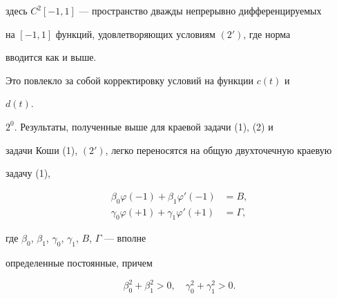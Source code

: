 здесь $C^2[-1,1]$ --- пространство дважды непрерывно дифференцируемых 


на $[-1,1]$ функций, удовлетворяющих условиям $(2')$, где норма 


вводится как и выше. 


Это повлекло за собой корректировку условий на функции $c(t)$ и 


$d(t)$. 


 


$2^0$. Результаты, полученные выше для краевой задачи (1), (2) и 


задачи Коши (1), $(2')$, легко переносятся на общую двухточечную краевую 


задачу (1), 


\begin{align*} 


\beta_0\varphi(-1)+\beta_1\varphi'(-1)&=B,\\ 


\gamma_0\varphi(+1)+\gamma_1\varphi'(+1)&=\Gamma, 


\end{align*} 


где $\beta_0$, $\beta_1$, $\gamma_0$, $\gamma_1$, $B$, $\Gamma$ --- вполне 


определенные постоянные, причем 


$$ 


\beta^2_0+\beta^2_1>0,\quad \gamma^2_0+\gamma^2_1>0. 


$$ 


 


